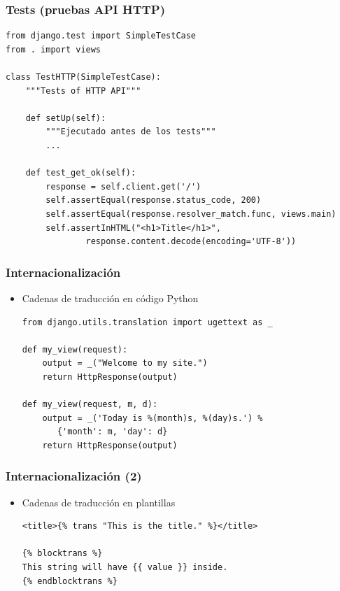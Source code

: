 
\begin{frame}[fragile]
\frametitle{Tests (pruebas API HTTP)}

{\small
\begin{verbatim}
from django.test import SimpleTestCase
from . import views

class TestHTTP(SimpleTestCase):
    """Tests of HTTP API"""

    def setUp(self):
        """Ejecutado antes de los tests"""
        ...

    def test_get_ok(self):
        response = self.client.get('/')
        self.assertEqual(response.status_code, 200)
        self.assertEqual(response.resolver_match.func, views.main)
        self.assertInHTML("<h1>Title</h1>",
                response.content.decode(encoding='UTF-8'))
\end{verbatim}
}

\end{frame}



\begin{frame}[fragile]
\frametitle{Internacionalización}

\begin{itemize}
\item Cadenas de traducción en código Python

\begin{verbatim}
from django.utils.translation import ugettext as _

def my_view(request):
    output = _("Welcome to my site.")
    return HttpResponse(output)

def my_view(request, m, d):
    output = _('Today is %(month)s, %(day)s.') % 
       {'month': m, 'day': d}
    return HttpResponse(output)
\end{verbatim}

\end{itemize}

\end{frame}


\begin{frame}[fragile]
\frametitle{Internacionalización (2)}

\begin{itemize}
\item Cadenas de traducción en plantillas

\begin{verbatim}
<title>{% trans "This is the title." %}</title>

{% blocktrans %}
This string will have {{ value }} inside.
{% endblocktrans %}
\end{verbatim}

\end{itemize}

\end{frame}


